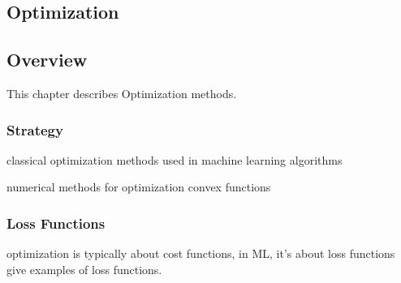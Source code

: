 

\renewcommand{\bibsection}{\subsection{\bibname}}
\begin{bibunit}

\chapter{Optimization}
\label{ch:optimization}

\section{Overview}
This chapter describes Optimization methods.


\subsection{Strategy}

classical optimization methods used in machine learning algorithms

numerical methods for optimization convex functions


\subsection{Loss Functions}
optimization is typically about cost functions, in ML, it's about loss functions 
give examples of loss functions.




\end{bibunit}
